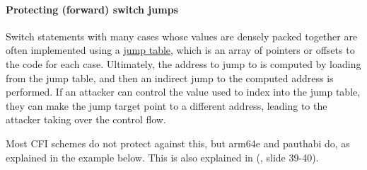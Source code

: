 \documentclass[
  a4paper,
]{report}
\begin{document}
\paragraph{Protecting (forward) switch
jumps}\label{protecting-forward-switch-jumps}

Switch statements with many cases whose values are densely packed
together are often implemented using a
\href{https://en.wikipedia.org/wiki/Branch_table}{\label{__index_entry_42}{jump
table}}, which is an array of pointers or offsets to
the code for each case. Ultimately, the address to jump to is computed
by loading from the jump table, and then an indirect jump to the
computed address is performed. If an attacker can control the value used
to index into the jump table, they can make the jump target point to a
different address, leading to the attacker taking over the control flow.

Most CFI schemes do not protect against this, but
\label{__index_entry_43}{arm64e} and
\label{__index_entry_44}{pauthabi} do, as
explained in the example below. This is also explained in
(, slide 39-40).
\end{document}
